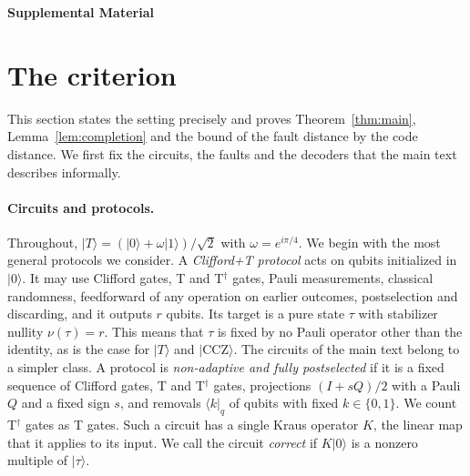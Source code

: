 \documentclass[aps,prl,reprint,twocolumn,amsmath,amssymb,floatfix,nofootinbib,superscriptaddress]{revtex4-2}
\theoremstyle{definition}
\theoremstyle{remark}
\newcommand{\CCZ}{\mathrm{CCZ}}
\begin{document}
%


\clearpage
\setcounter{secnumdepth}{2}\setcounter{section}{0}\setcounter{equation}{0}\setcounter{table}{0}\setcounter{figure}{0}
\renewcommand{\thesection}{S\arabic{section}}
\renewcommand{\theequation}{S\arabic{equation}}
\renewcommand{\thetable}{S\Roman{table}}
\renewcommand{\thefigure}{S\arabic{figure}}
\onecolumngrid
\begin{center}\textbf{\large Supplemental Material}\end{center}

\section{The criterion}\label{sm:proofs}
This section states the setting precisely and proves Theorem~\ref{thm:main}, Lemma~\ref{lem:completion} and the bound of the fault distance by the code distance. We first fix the circuits, the faults and the decoders that the main text describes informally.
\paragraph*{Circuits and protocols.}
Throughout, $|T\rangle=(|0\rangle+\omega|1\rangle)/\sqrt2$ with $\omega=e^{i\pi/4}$. We begin with the most general protocols we consider. A \emph{Clifford+T protocol} acts on qubits initialized in $|0\rangle$. It may use Clifford gates, T and T$^\dagger$ gates, Pauli measurements, classical randomness, feedforward of any operation on earlier outcomes, postselection and discarding, and it outputs $r$ qubits. Its target is a pure state $\tau$ with stabilizer nullity $\nu(\tau)=r$. This means that $\tau$ is fixed by no Pauli operator other than the identity, as is the case for $|T\rangle$ and $|\CCZ\rangle$. The circuits of the main text belong to a simpler class. A protocol is \emph{non-adaptive and fully postselected} if it is a fixed sequence of Clifford gates, T and T$^\dagger$ gates, projections $(I+sQ)/2$ with a Pauli $Q$ and a fixed sign $s$, and removals $\langle k|_q$ of qubits with fixed $k\in\{0,1\}$. We count T$^\dagger$ gates as T gates. Such a circuit has a single Kraus operator $K$, the linear map that it applies to its input. We call the circuit \emph{correct} if $K|0\rangle$ is a nonzero multiple of $|\tau\rangle$.
\end{document}
